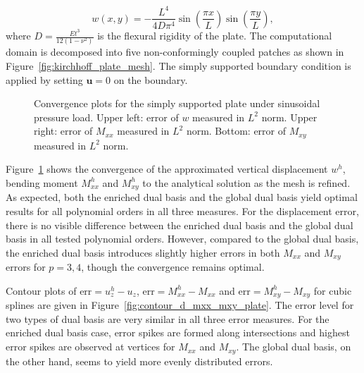 \begin{equation}
	w(x, y) = -\frac{L^4}{4D\pi^4}\sin(\frac{\pi x}{L}) \sin(\frac{\pi y}{L}),
\end{equation}
where $D = \frac{Et^3}{12(1-\nu^2)}$ is the flexural rigidity of the plate. The computational domain is decomposed into five non-conformingly coupled patches as shown in Figure~\ref{fig:kirchhoff_plate_mesh}. The simply supported boundary condition is applied by setting $\mathbf{u}=0$ on the boundary.\par
\begin{figure}[h]
	\center
	\captionsetup[subfigure]{labelformat=empty}
	\begin{subfigure}{.47\linewidth}
		\center
		
	\end{subfigure}\hfil
	\begin{subfigure}{.47\linewidth}
		\center
		
	\end{subfigure}
	\begin{subfigure}{.47\linewidth}
		\center
		
	\end{subfigure}
	\caption{Convergence plots for the simply supported plate under sinusoidal pressure load. Upper left: error of $w$ measured in $L^2$ norm. Upper right: error of $M_{xx}$ measured in $L^2$ norm. Bottom: error of $M_{xy}$ measured in $L^2$ norm.}\label{fig:convergence_square_plate}
\end{figure}
Figure~\ref{fig:convergence_square_plate} shows the convergence of the approximated vertical displacement $w^h$, bending moment $M^h_{xx}$ and $M^h_{xy}$ to the analytical solution as the mesh is refined. As expected, both the enriched \Bezier dual basis and the global dual basis yield optimal results for all polynomial orders in all three measures. For the displacement error, there is no visible difference between the enriched \Bezier dual basis and the global dual basis in all tested polynomial orders. However, compared to the global dual basis, the enriched \Bezier dual basis introduces slightly higher errors in both $M_{xx}$ and $M_{xy}$ errors for $p = 3,4$, though the convergence remains optimal. \par

Contour plots of $\text{err} = u_z^h-u_z$, $\text{err} = M_{xx}^h-M_{xx}$ and $\text{err} = M_{xy}^h-M_{xy}$ for cubic splines are given in Figure~\ref{fig:contour_d_mxx_mxy_plate}. The error level for two types of dual basis are very similar in all three error measures. For the enriched \Bezier dual basis case, error spikes are formed along intersections and highest error spikes are observed at vertices for $M_{xx}$ and $M_{xy}$. The global dual basis, on the other hand, seems to yield more evenly distributed errors.

